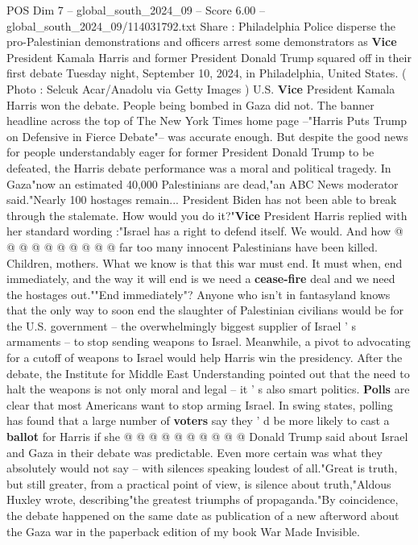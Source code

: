 \begin{textsample}{POS Dim 7 – global\_south\_2024\_09 – Score 6.00 – global\_south\_2024\_09/114031792.txt}  \label{ex:f7_pos_232}
Share : Philadelphia Police disperse the pro-Palestinian demonstrations and officers arrest some demonstrators as \textbf{Vice} President Kamala Harris and former President Donald Trump squared off in their first debate Tuesday night, September 10, 2024, in Philadelphia, United States. ( Photo : Selcuk Acar/Anadolu via Getty Images ) U.S. \textbf{Vice} President Kamala Harris won the debate.
People being bombed in Gaza did not.
The banner headline across the top of The New York Times home page --"Harris Puts Trump on Defensive in Fierce Debate"-- was accurate enough.
But despite the good news for people understandably eager for former President Donald Trump to be defeated, the Harris debate performance was a moral and political tragedy.
In Gaza"now an estimated 40,000 Palestinians are dead,"an ABC News moderator said."Nearly 100 hostages remain...
President Biden has not been able to break through the stalemate.
How would you do it?"\textbf{Vice} President Harris replied with her standard wording :"Israel has a right to defend itself.
We would.
And how @ @ @ @ @ @ @ @ @ @ far too many innocent Palestinians have been killed.
Children, mothers.
What we know is that this war must end.
It must when, end immediately, and the way it will end is we need a \textbf{cease-fire} deal and we need the hostages out.""End immediately"?
Anyone who isn't in fantasyland knows that the only way to soon end the slaughter of Palestinian civilians would be for the U.S. government -- the overwhelmingly biggest supplier of Israel ' s armaments -- to stop sending weapons to Israel.
Meanwhile, a pivot to advocating for a cutoff of weapons to Israel would help Harris win the presidency.
After the debate, the Institute for Middle East Understanding pointed out that the need to halt the weapons is not only moral and legal -- it ' s also smart politics. \textbf{Polls} are clear that most Americans want to stop arming Israel.
In swing states, polling has found that a large number of \textbf{voters} say they ' d be more likely to cast a \textbf{ballot} for Harris if she @ @ @ @ @ @ @ @ @ @ Donald Trump said about Israel and Gaza in their debate was predictable.
Even more certain was what they absolutely would not say -- with silences speaking loudest of all."Great is truth, but still greater, from a practical point of view, is silence about truth,"Aldous Huxley wrote, describing"the greatest triumphs of propaganda."By coincidence, the debate happened on the same date as publication of a new afterword about the Gaza war in the paperback edition of my book War Made Invisible.

\end{textsample}
